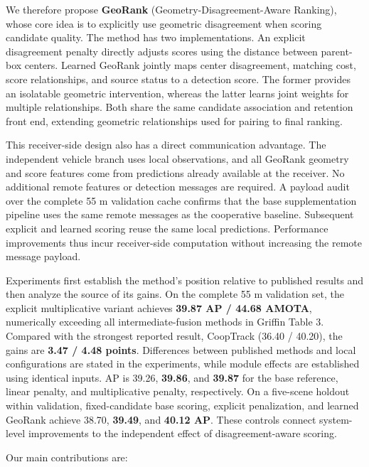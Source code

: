 We therefore propose \textbf{GeoRank} (Geometry-Disagreement-Aware Ranking), whose core idea is to explicitly use geometric disagreement when scoring candidate quality. The method has two implementations. An explicit disagreement penalty directly adjusts scores using the distance between parent-box centers. Learned GeoRank jointly maps center disagreement, matching cost, score relationships, and source status to a detection score. The former provides an isolatable geometric intervention, whereas the latter learns joint weights for multiple relationships. Both share the same candidate association and retention front end, extending geometric relationships used for pairing to final ranking.

This receiver-side design also has a direct communication advantage. The independent vehicle branch uses local observations, and all GeoRank geometry and score features come from predictions already available at the receiver. No additional remote features or detection messages are required. A payload audit over the complete 55 m validation cache confirms that the base supplementation pipeline uses the same remote messages as the cooperative baseline. Subsequent explicit and learned scoring reuse the same local predictions. Performance improvements thus incur receiver-side computation without increasing the remote message payload.

Experiments first establish the method's position relative to published results and then analyze the source of its gains. On the complete 55 m validation set, the explicit multiplicative variant achieves \textbf{39.87 AP / 44.68 AMOTA}, numerically exceeding all intermediate-fusion methods in Griffin Table 3. Compared with the strongest reported result, CoopTrack (36.40 / 40.20), the gains are \textbf{3.47 / 4.48 points}. Differences between published methods and local configurations are stated in the experiments, while module effects are established using identical inputs. AP is 39.26, \textbf{39.86}, and \textbf{39.87} for the base reference, linear penalty, and multiplicative penalty, respectively. On a five-scene holdout within validation, fixed-candidate base scoring, explicit penalization, and learned GeoRank achieve 38.70, \textbf{39.49}, and \textbf{40.12 AP}. These controls connect system-level improvements to the independent effect of disagreement-aware scoring.

Our main contributions are:

